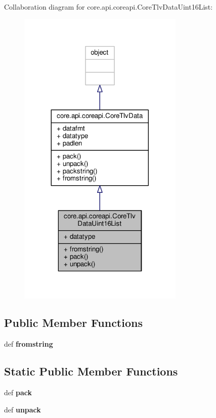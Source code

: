 Collaboration diagram for core.\+api.\+coreapi.\+Core\+Tlv\+Data\+Uint16\+List\+:
\nopagebreak
\begin{figure}[H]
\begin{center}
\leavevmode
\includegraphics[width=224pt]{classcore_1_1api_1_1coreapi_1_1_core_tlv_data_uint16_list__coll__graph}
\end{center}
\end{figure}
\subsection*{Public Member Functions}
\begin{DoxyCompactItemize}
\item 
\hypertarget{classcore_1_1api_1_1coreapi_1_1_core_tlv_data_uint16_list_aba69c09db56bdc7cd2f0541305870f82}{def {\bfseries fromstring}}\label{classcore_1_1api_1_1coreapi_1_1_core_tlv_data_uint16_list_aba69c09db56bdc7cd2f0541305870f82}

\end{DoxyCompactItemize}
\subsection*{Static Public Member Functions}
\begin{DoxyCompactItemize}
\item 
\hypertarget{classcore_1_1api_1_1coreapi_1_1_core_tlv_data_uint16_list_ac8a46bda2ab34bf10a69e0c75c2ecdbc}{def {\bfseries pack}}\label{classcore_1_1api_1_1coreapi_1_1_core_tlv_data_uint16_list_ac8a46bda2ab34bf10a69e0c75c2ecdbc}

\item 
\hypertarget{classcore_1_1api_1_1coreapi_1_1_core_tlv_data_uint16_list_aa69a59fedd18b3d32f2e9e1f8e030393}{def {\bfseries unpack}}\label{classcore_1_1api_1_1coreapi_1_1_core_tlv_data_uint16_list_aa69a59fedd18b3d32f2e9e1f8e030393}

\end{DoxyCompactItemize}
